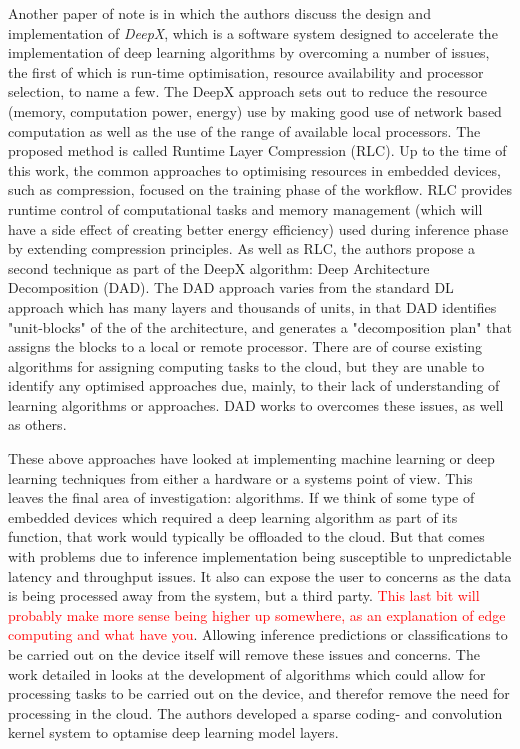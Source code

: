 \documentclass[conference]{IEEEtran}
\begin{document}
Another paper of note is \cite{Lane2016} in which the authors discuss the design and implementation of \textit{DeepX}, which is a software system designed to accelerate the implementation of deep learning algorithms by overcoming a number of issues, the first of which is run-time optimisation, resource availability and processor selection, to name a few. The DeepX approach sets out to reduce the resource (memory, computation power, energy) use by making good use of network based computation as well as the use of the range of available local processors. The proposed method is called Runtime Layer Compression (RLC). Up to the time of this work, the common approaches to optimising resources in embedded devices, such as compression, focused on the training phase of the workflow. RLC provides runtime control of computational tasks and memory management (which will have a side effect of creating better energy efficiency) used during inference phase by extending compression principles. As well as RLC, the authors propose a second technique as part of the DeepX algorithm: Deep Architecture Decomposition (DAD). The DAD approach varies from the standard DL approach which has many layers and thousands of units, in that DAD identifies "unit-blocks" of the of the architecture, and generates a "decomposition plan" that assigns the blocks to a local or remote processor. There are of course existing algorithms for assigning computing tasks to the cloud, but they are unable to identify any optimised approaches due, mainly, to their lack of understanding of learning algorithms or approaches. DAD works to overcomes these issues, as well as others.

These above approaches have looked at implementing machine learning or deep learning techniques from either a hardware or a systems point of view. This leaves the final area of investigation: algorithms. If we think of some type of embedded devices which required a deep learning algorithm as part of its function, that work would typically be offloaded to the cloud. But that comes with problems due to inference implementation being susceptible to unpredictable latency and throughput issues. It also can expose the user to concerns as the data is being processed away from the system, but a third party. \textcolor{red}{This last bit will probably make more sense being higher up somewhere, as an explanation of edge computing and what have you}. Allowing inference predictions or classifications to be carried out on the device itself will remove these issues and concerns. The work detailed in \cite{Bhattacharya2016} looks at the development of algorithms which could allow for processing tasks to be carried out on the device, and therefor remove the need for processing in the cloud. The authors developed a sparse coding- and convolution kernel system to optamise deep learning model layers. 





\printbibliography
\vspace{12pt}
\end{document}
